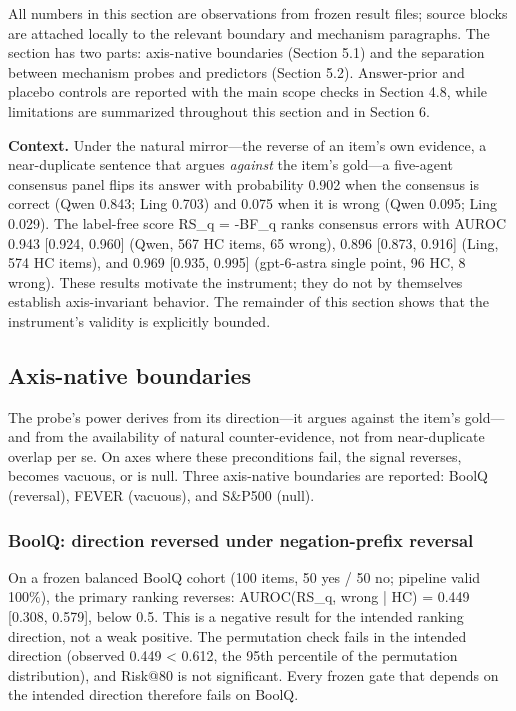 \documentclass[11pt]{article}
\begin{document}
All numbers in this section are observations from frozen result files; source blocks are attached locally to the relevant boundary and mechanism paragraphs. The section has two parts: axis-native boundaries (Section 5.1) and the separation between mechanism probes and predictors (Section 5.2). Answer-prior and placebo controls are reported with the main scope checks in Section 4.8, while limitations are summarized throughout this section and in Section 6.

\textbf{Context.} Under the natural mirror---the reverse of an item's own evidence, a near-duplicate sentence that argues \emph{against} the item's gold---a five-agent consensus panel flips its answer with probability 0.902 when the consensus is correct (Qwen 0.843; Ling 0.703) and 0.075 when it is wrong (Qwen 0.095; Ling 0.029). The label-free score RS\_\allowbreak{}q = -BF\_\allowbreak{}q ranks consensus errors with AUROC 0.943 [0.924, 0.960] (Qwen, 567 HC items, 65 wrong), 0.896 [0.873, 0.916] (Ling, 574 HC items), and 0.969 [0.935, 0.995] (gpt-6-astra single point, 96 HC, 8 wrong). These results motivate the instrument; they do not by themselves establish axis-invariant behavior. The remainder of this section shows that the instrument's validity is explicitly bounded.

\subsection{Axis-native boundaries}

The probe's power derives from its direction---it argues against the item's gold---and from the availability of natural counter-evidence, not from near-duplicate overlap per se. On axes where these preconditions fail, the signal reverses, becomes vacuous, or is null. Three axis-native boundaries are reported: BoolQ (reversal), FEVER (vacuous), and S\&P500 (null).

\subsubsection{BoolQ: direction reversed under negation-prefix reversal}

On a frozen balanced BoolQ cohort (100 items, 50 yes / 50 no; pipeline valid 100\%), the primary ranking reverses: AUROC(RS\_\allowbreak{}q, wrong | HC) = 0.449 [0.308, 0.579], below 0.5. This is a negative result for the intended ranking direction, not a weak positive. The permutation check fails in the intended direction (observed 0.449 < 0.612, the 95th percentile of the permutation distribution), and Risk@80 is not significant. Every frozen gate that depends on the intended direction therefore fails on BoolQ.
\end{document}
